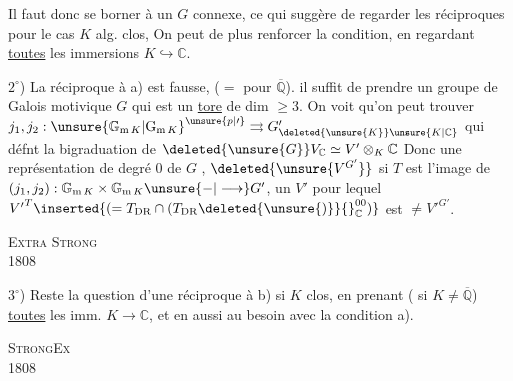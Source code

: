 Il faut donc se borner à un $G$ connexe, ce qui suggère de regarder les réciproques pour le cas $K$ alg. clos,  On peut de plus renforcer la condition, en regardant \uline{toutes} les immersions $K\hookrightarrow\mathbb C$.

$2^\circ$) La réciproque à a) est fausse,  ($=$ pour $\overline{\mathbb Q}$). il suffit de prendre un groupe de Galois motivique $G$ qui est un \uline{tore} de dim $\geq 3$. On voit qu'on peut trouver 
$j_1,j_2:{\unsure{\mathbb G_{\mathrm m\,K}|\mathrm G_{\mathrm m\,K}}}^{\unsure{p|\prime}}\rightrightarrows G'_{\deleted{\unsure{K}}\unsure{K|\mathbb C}}$ qui défnt  la bigraduation de
$\deleted{\unsure{G}}V_{\mathbb C}\simeq V'\otimes_K\mathbb C$ \quad [$V'=P\mathbin{\overset{G_K}{\deleted{\unsure{\times}}}}V$, $P\unsure{\simeq|=}\underline{\operatorname{Isom}}_{\otimes}(T_{\mathrm B}\otimes K,T_{\mathrm{DR}})$]
Donc une représentation  de degré 0 de $G$ , $\deleted{\unsure{V^{G'}}}$ si $T$ est l'image de $(j_1,j_2):\mathbb G_{\mathrm m\,K}\times\mathbb G_{\mathrm m\,K}\unsure{-|\longrightarrow}G'$, un $V'$ pour lequel
${V'}^{T}\inserted{(=T_{\mathrm{DR}}\cap(T_{\mathrm{DR}}\deleted{\unsure{)}}{}_{\mathbb C}^{00})}$
 est $\ne {V'}^{G'}$.
\par\noindent\textsc{Extra Strong}\\
 1808

$3^\circ$) Reste la question d'une réciproque à b) si $K$  clos, en prenant ( si $K\ne\overline{\mathbb Q}$) \uline{toutes} les imm. $K\longrightarrow\mathbb C$, et en  aussi au besoin avec la condition a).
\par\noindent\textsc{ Strong}\hfill\textsc{Ex}\\
 1808\hfill{}
